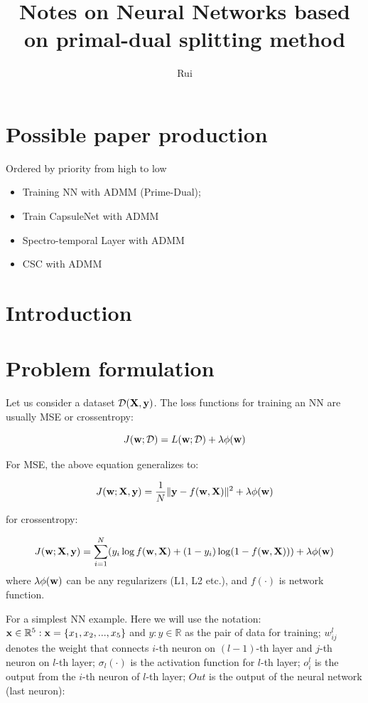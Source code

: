\documentclass[11pt,a4paper]{article}
\title{Notes on Neural Networks based on primal-dual splitting method }
\author{Rui}
\begin{document}
\maketitle

\tableofcontents
\section{Possible paper production}
Ordered by priority from high to low
\begin{itemize}
	\item Training NN with ADMM (Prime-Dual); 
	\item Train CapsuleNet with ADMM
	\item Spectro-temporal Layer with ADMM
	\item CSC with ADMM
\end{itemize}
\section{Introduction}

\section{Problem formulation}

Let us consider a dataset $\mathcal{D} (\mathbf{X}, \mathbf{y})$. The loss functions for training an NN are usually MSE or crossentropy:

\begin{equation}
J(\mathbf{w}; \mathcal{D}) = L(\mathbf{w}; \mathcal{D}) + \lambda \phi (\mathbf{w})
\end{equation}

For MSE, the above equation generalizes to:

\begin{equation}
J(\mathbf{w}; \mathbf{X}, \mathbf{y}) = \frac{1}{N}\lVert\mathbf{y} - f(\mathbf{w}, \mathbf{X})\rVert^2 + \lambda \phi(\mathbf{w})
\end{equation}

for crossentropy:

\begin{equation}
J(\mathbf{w}; \mathbf{X}, \mathbf{y}) = \sum^N_{i=1}(y_i\log f(\mathbf{w},\mathbf{X}) + (1-y_i)\log (1-f(\mathbf{w}, \mathbf{X}))) + \lambda \phi(\mathbf{w})
\end{equation}
where $\lambda \phi(\mathbf{w})$ can be any regularizers (L1, L2 etc.), and $f(\cdot)$ is network function. 

For a simplest NN example. Here we will use the notation: $\mathbf{x}\in \mathbb{R}^5: \mathbf{x} = \{x_1, x_2, ..., x_5\}$ and $y: y\in \mathbb{R}$ as the pair of data for training; $w^l_{ij}$ denotes the weight that connects $i$-th neuron on $(l-1)$-th layer and $j$-th neuron on $l$-th layer; $\sigma_l(\cdot)$ is the activation function for $l$-th layer; $o^l_i$ is the output from the $i$-th neuron of $l$-th layer; $Out$ is the output of the neural network (last neuron): 
\end{document}
